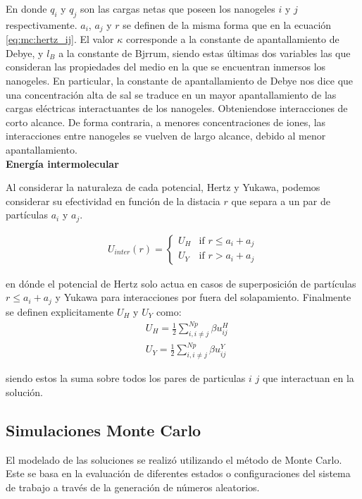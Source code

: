 	\noindent En donde $q_i$ y $q_j$ son las cargas netas que poseen los nanogeles $i$ y $j$ respectivamente. $a_i$, $a_j$ y $r$ se definen de la misma forma que en la ecuaci\'on \ref{eq:mc:hertz_ij}. El valor $\kappa$ corresponde a la constante de apantallamiento de Debye, y $l_B$ a la constante de Bjrrum, siendo estas \'ultimas dos variables las que consideran las propiedades del medio en la que se encuentran inmersos los nanogeles. 
	En particular, la constante de apantallamiento de Debye nos dice que una concentraci\'on alta de sal se traduce en un mayor apantallamiento de las cargas el\'ectricas interactuantes de los nanogeles.  Obteniendose interacciones de corto alcance.
	De forma contraria, a menores concentraciones de iones, las interacciones entre nanogeles se vuelven de largo alcance, debido al menor apantallamiento.\\
	
	\textbf{Energ\'ia intermolecular}
	
	Al considerar la naturaleza de cada potencial, Hertz y Yukawa, podemos considerar su efectividad en funci\'on de la distacia $r$ que separa a un par de part\'iculas $a_i$ y $a_j$.
	
	\begin{align}
		U_{inter}(r) = \begin{cases} U_H  & \text{if } r \leq a_i + a_j \\ U_Y & \text{if } r > a_i + a_j \end{cases} 
		\label{eq:mc:HY-potential}
	\end{align}
	
	\noindent en d\'onde el potencial de Hertz solo actua en casos de superposici\'on de part\'iculas $r \leq a_i + a_j$ y Yukawa para interacciones por fuera del solapamiento.
	Finalmente se definen explicitamente $U_H$ y $U_Y$ como:
	\begin{align}
		& U_H =\frac{1}{2} \sum^{Np}_{i,i \neq j} \beta u^H_{ij} \\
		& U_Y = \frac{1}{2} \sum^{Np}_{i,i \neq j} \beta u^Y_{ij}
	\end{align}
	
	\noindent siendo estos la suma sobre todos los pares de particulas $i$ $j$ que interactuan en la soluci\'on.
	
	
	\subsection{Simulaciones Monte Carlo} \label{sec:mc:mc}
	
	El modelado de las soluciones se realiz\'o utilizando el m\'etodo de Monte Carlo. Este se basa en la evaluaci\'on de diferentes estados o configuraciones del sistema de trabajo a trav\'es de la generaci\'on de n\'umeros aleatorios.
	
